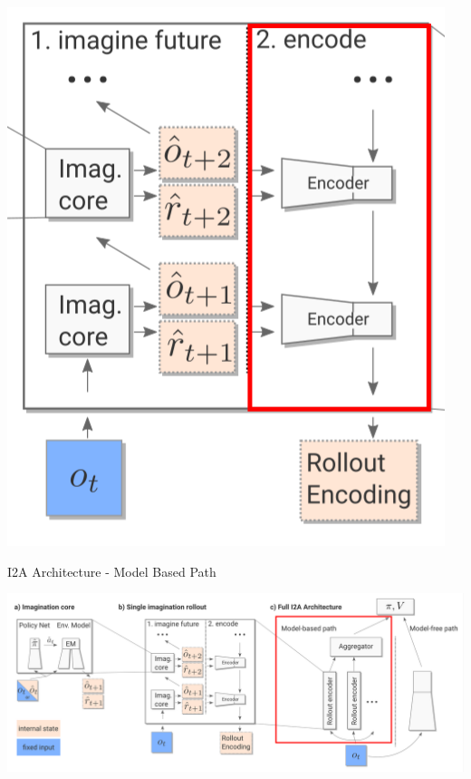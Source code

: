   \begin{center} 
    \includegraphics[height=.5\textheight]{./Images/encoder.png}%
  \end{center} 
 
 
 
I2A Architecture - Model Based Path 
 
 
\includegraphics[width=\columnwidth]{./Images/i2a_all_model_based_path.png}%
 
 
